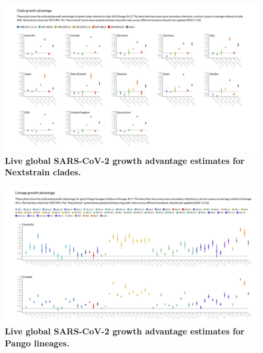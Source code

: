 \begin{figure}[h]
    \centering
    \includegraphics[width=1.0\linewidth]{./figures/clade_growth_advantages.png}
    \caption{
      \textbf{Live global SARS-CoV-2 growth advantage estimates for Nextstrain clades.}
    }
    \label{fig:fn_clade_growth_advantages}
\end{figure}


\begin{figure}[h]
    \centering
    \includegraphics[width=1.0\linewidth]{./figures/lineage_growth_advantages.png}
    \caption{
      \textbf{Live global SARS-CoV-2 growth advantage estimates for Pango lineages.}
    }
    \label{fig:fn_lineage_growth_advantages}
\end{figure}
